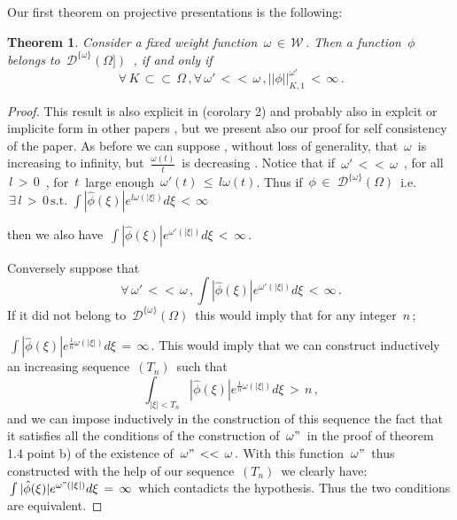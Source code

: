 \documentclass[12pt,a4paper]{amsart}
\newtheorem{theorem}{Theorem}[section]
\begin{document}
 Our first theorem on projective presentations is the following:
 
 \begin{theorem}
 Consider a fixed weight function
 $\,\omega\,\in\,\mathcal{W}\,$.
  Then a function $\,\phi\,$ belongs to 
  $\,\mathcal{D}^{\{\omega\}}(\Omega])\,$ , if and only if 
  $$\,\forall\, K\,\subset\subset\,\Omega\,
  ,\forall\,\omega'\,<<\,\omega\,,
  ||\phi||_{K,1}^{\omega'}\,<\,\infty\,.$$
 
 \end{theorem}
 
 \begin{proof}
 
 This result is also explicit in \cite{D.P.V.} (corolary 2) and probably also in explcit or implicite form in other papers ,  but we present also our proof for self consistency of the paper.
 As before we can suppose , without loss of generality, that $\,\omega\,$ is increasing to infinity, but 
 $\,\frac{\omega(t)}{t}\,$ is decreasing .
 Notice that if $\,\omega'\,<<\,\omega\,$ , for all $\,l\,>\,0\,$ , for $\,t\,$ large enough 
 $\,\omega'(t)\,\leq\, l\omega(t)$.
 Thus if
  $\,\phi\,\in\,\,\mathcal{D}^{\{\omega\}}(\Omega)\,$ i.e.
  $\,\exists\,l\,>\,0\,\mbox{s.t.}\,
 \,\int|\hat{\phi}(\xi)|e^{l\omega(|\xi|)}d\xi\,<\,\infty$
 
  then we also have
   $\,\int|\hat{\phi}(\xi)|e^{\omega'(|\xi|)}d\xi\,<\,\infty\,.$
  
    Conversely suppose that 
    $$\,\forall\,\omega'\,<<\,\omega\,
    ,\int|\hat{\phi}(\xi)|e^{\omega'(|\xi|)}d\xi
    \,<\,\infty\,.$$ 
    If it did not belong to
     $\,\mathcal{D}^{\{\omega\}}(\Omega)\,$
    this would imply that for any integer $\,n\,$; 
    
$\,
\int|\hat{\phi}(\xi)|e^{\frac{1}{n}\omega(|\xi|)}d\xi\,=\,\infty\,.$
    This would imply that we can construct inductively an increasing sequence $\,(T_n)\,$  such that  
$$\,\int_{|\xi|<T_n}|\hat{\phi}(\xi)|e^{\frac{1}{n}\omega(|\xi|)}d\xi\,>\,n\,,$$ and we can impose inductively in the construction of this sequence  the fact  that it satisfies all the conditions of the construction of 
$\,\omega"\,$
 in the proof of theorem 1.4 point b) of the existence of 
 $\,\omega"\,<<\,\omega\,.$
 With this function $\,\omega"\,$ thus constructed with the help of our sequence $\,(T_n)\,$
 we clearly have: 
 $\,\int|\hat{\phi}(\xi)|e^{\omega"(|\xi|)}d\xi
 \,=\,\infty\,$
 which contadicts the hypothesis. 
 Thus the two conditions are equivalent.  


 \end{proof}
 
\end{document}
